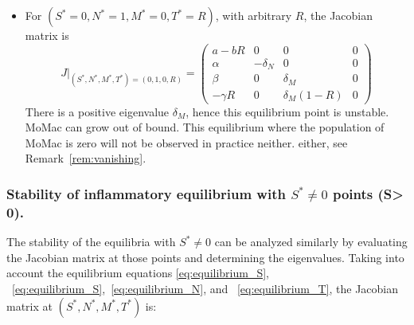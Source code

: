\documentclass[a4paper, 12pt]{article}
\providecommand{\DIFaddtex}[1]{{\protect\color{blue} \sf #1}} %
\providecommand{\DIFdeltex}[1]{{\protect\color{red} \scriptsize #1}} %
\providecommand{\DIFaddbegin}{} %
\providecommand{\DIFaddend}{} %
\providecommand{\DIFdelbegin}{} %
\providecommand{\DIFdelend}{} %
\providecommand{\DIFadd}[1]{\texorpdfstring{\DIFaddtex{#1}}{#1}} %
\providecommand{\DIFdel}[1]{\texorpdfstring{\DIFdeltex{#1}}{}} %
\begin{document}
\begin{itemize}
{}%
\DIFdel{For $S^* = 0, N^* = 1, M^* = 0, T^* = R$}\DIFdelend \DIFaddbegin \DIFadd{either, see Remark~\ref{rem:vanishing}.
}\item \DIFadd{For $(S^* = 0, N^* = 1, M^* = 0, T^* = R)$}\DIFaddend , with arbitrary $R$, the Jacobian matrix is
\[
J|_{(S^*, N^*, M^*, T^*) = (0, 1, 0, R)} =
\begin{pmatrix}
a - b R & 0 & 0 & 0 \\
\alpha & -\delta_N & 0 & 0 \\
\beta & 0 & \delta_M & 0 \\
-\gamma R & 0 & \delta_M (1 - R) & 0
\end{pmatrix}
\]
There is a positive eigenvalue $\delta_M$, hence this equilibrium point is unstable. MoMac can grow out of bound. This equilibrium  \DIFaddbegin \DIFadd{where the population of MoMac is zero }\DIFaddend will not be observed in practice \DIFdelbegin \DIFdel{neither.
}\DIFdelend \DIFaddbegin \DIFadd{either, see Remark~\ref{rem:vanishing}.
}\end{itemize}
\DIFaddend \subsubsection{Stability of \DIFaddbegin \DIFadd{inflammatory }\DIFaddend equilibrium \DIFdelbegin \DIFdel{with $S^*\neq 0$}\DIFdelend \DIFaddbegin \DIFadd{points (S> 0)}\DIFaddend .}
The stability of the equilibria with $S^* \neq 0$ can be analyzed similarly by evaluating the Jacobian matrix at those points and determining the eigenvalues.
Taking into account the equilibrium equations\DIFdelbegin \DIFdel{\eqref{eq:equilibrium_S}, }\DIFdelend \DIFaddbegin \DIFadd{~\eqref{eq:equilibrium_S},~}\DIFaddend \eqref{eq:equilibrium_N}, and\DIFaddbegin \DIFadd{~}\DIFaddend \eqref{eq:equilibrium_T}, the Jacobian matrix at $(S^*, N^*, M^*, T^*)$ is:
\end{document}

